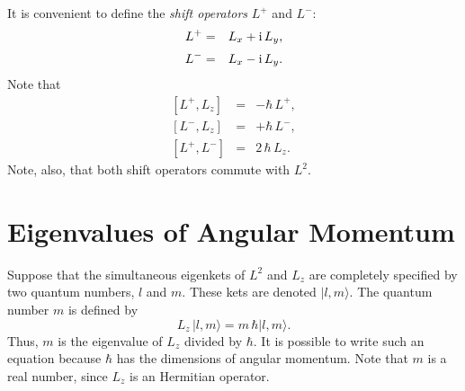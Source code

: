 It is convenient to define the {\em shift operators} $L^+$ and $L^-$:
\begin{eqnarray}
L^+ &=& L_x + {\rm i}\, L_y,\\[0.5ex]
L^- &=& L_x -{\rm i} \,L_y.
\end{eqnarray}
Note that
\begin{eqnarray}\label{e5.13a}
[L^+, L_z ] &=& -\hbar\,L^+,\\[0.5ex]
[L^-, L_z] &=& +\hbar\,L^-,\\[0.5ex]
[L^+, L^-] &=& 2\,\hbar\,L_z.
\end{eqnarray}
Note, also, that both  shift operators commute with $L^2$. 

\section{Eigenvalues of Angular Momentum}\label{s5.2}
Suppose that the simultaneous eigenkets of $L^2$ and $L_z$ are completely
specified by two quantum numbers, $l$ and $m$. These  kets are denoted
$|l, m\rangle$. The quantum number $m$ is defined by
\begin{equation}
L_z \,|l, m\rangle = m\,\hbar |l, m\rangle.
\end{equation}
Thus, $m$ is the eigenvalue of $L_z$ divided by $\hbar$. It is possible
to write such an equation because $\hbar$ has the dimensions of angular momentum.
Note that $m$ is a real number, since  $L_z$ is an Hermitian operator. 


